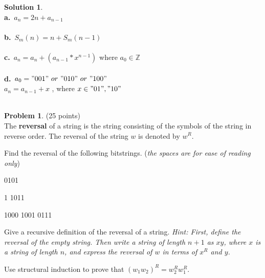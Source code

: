\documentclass{article}
\theoremstyle{definition}
\newtheorem{problem}{Problem}
\newtheorem*{solution}{Solution}
\begin{document}
\begin{solution}\ \\
\textbf{a.}\ $a_n = 2n + a_{n-1} $ \ \\
\ \\
\textbf{b.}\ $S_m(n) = n + S_m(n-1)$\ \\
\ \\
\textbf{c.}\ $a_n = a_{n} + (a_{n-1}*x^{n-1}) $  where $a_0 \in \mathbb{Z}$\ \\ 
\ \\
\textbf{d.}\ $a_0 = "001" \ or \ "010" \ or \ "100" $ \ \\
$a_n = a_{n-1} + x$ , where $x \in "01" , "10"$\ \\
\ \\


\end{solution}


\newpage

\begin{problem} (25 points)\\
The \textbf{reversal} of a string is the string consisting of the symbols of the string in reverse order.  The reversal of the string $w$ is denoted by $w^R$.
\begin{compactenum}
\renewcommand{\theenumi}{\alph{enumi}}
\item Find the reversal of the following bitstrings. (\textit{the spaces are for ease of reading only})
\begin{compactenum}
\renewcommand{\theenumi}{\alph{enumii}}
\item 0101
\item 1 1011
\item 1000 1001 0111
\end{compactenum}
\item Give a recursive definition of the reversal of a string. \textit{Hint: First, define the reversal of the empty string.  Then write a string of length $n+1$ as $xy$, where $x$ is a string of length $n$, and express the reversal of $w$ in terms of $x^R$ and $y$.}
\item Use structural induction to prove that $(w_1w_2)^R=w_2^Rw_1^R$.
\end{compactenum}
\end{problem}
\end{document}
